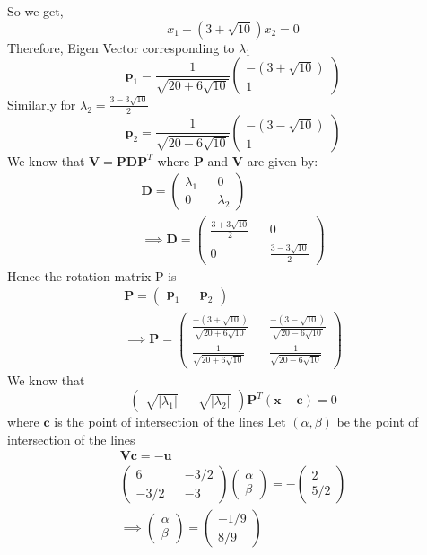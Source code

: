 \documentclass[journal,13pt,twocolumn]{IEEEtran}
\newcommand{\myvec}[1]{\ensuremath{\begin{pmatrix}#1\end{pmatrix}}}
\renewcommand{\vec}[1]{\mathbf{#1}}
\begin{document}
So we get,
\begin{equation}\label{eq:2.14}
x_1 + (3+\sqrt{10})x_2 = 0
\end{equation}
Therefore, Eigen Vector corresponding to $\lambda_1$
\begin{equation}\label{eq:2.15}
\vec{p}_1 =\frac{1}{\sqrt{20+6\sqrt{10}}} \myvec{-(3+\sqrt{10}) \\ 1}
\end{equation}
Similarly for $\lambda_2 = \frac{3-3\sqrt{10}}{2}$
\begin{equation}\label{eq:2.16}
\vec{p}_2 =\frac{1}{\sqrt{20-6\sqrt{10}}} \myvec{-(3-\sqrt{10}) \\ 1}
\end{equation}
We know that $\vec{V} = \vec{P}\vec{D}\vec{P}^T$ where $\vec{P}$ and $\vec{V}$ are given by:
\begin{equation} \label{eq:2.17}
\begin{split}
\vec{D} = \myvec{\lambda_1 && 0\\ 0 && \lambda_2}\\
\implies \vec{D} = \myvec{\frac{3+3\sqrt{10}}{2} && 0\\ 0 &&\frac{3-3\sqrt{10}}{2} }
\end{split}
\end{equation}
Hence the rotation matrix P is
\begin{equation} \label{eq:2.18}
\begin{split}
\vec{P} = \myvec{\vec{p}_1 && \vec{p}_2}\\
\implies \vec{P} = \myvec{\frac{-(3+\sqrt{10})}{\sqrt{20+6\sqrt{10}}} && \frac{-(3-\sqrt{10})}{\sqrt{20-6\sqrt{10}}} \\ \frac{1}{\sqrt{20+6\sqrt{10}}} && \frac{1}{\sqrt{20-6\sqrt{10}}}}
\end{split}
\end{equation}
We know that 
\begin{equation} \label{eq:2.19}
\myvec{\sqrt{|\lambda_1|} && \sqrt{|\lambda_2|}}\vec{P}^T(\vec{x}-\vec{c}) = 0
\end{equation}
where $\vec{c}$ is the point of intersection of the lines 
Let $(\alpha,\beta)$ be the point of intersection of the lines 
\begin{equation} \label{eq:2.20}
\begin{split}
\vec{V}\vec{c} = -\vec{u}\\
\myvec{6 && -3/2\\-3/2 && -3} \myvec{\alpha \\ \beta} = -\myvec{2 \\ 5/2}\\
\implies \myvec{\alpha \\ \beta} = \myvec{-1/9 \\ 8/9}
\end{split}
\end{equation}
\end{document}
